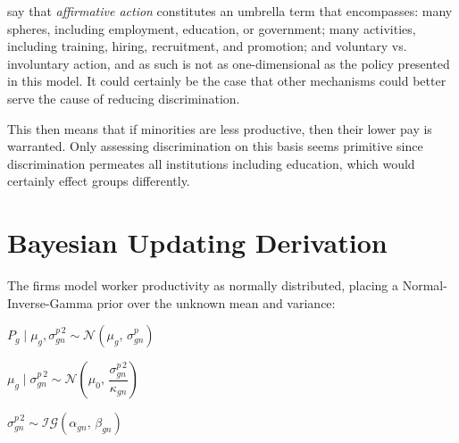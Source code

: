 \documentclass[]{article}
\begin{document}


\cite{HolzerNeumark1999} say that \textit{affirmative action} constitutes an umbrella term that encompasses: many spheres, including employment, education, or government; many activities, including training, hiring, recruitment, and promotion; and voluntary vs. involuntary action, and as such is not as one-dimensional as the policy presented in this model. It could certainly be the case that other mechanisms could better serve the cause of reducing discrimination.




This then means that if minorities are less productive, then their lower pay is warranted. Only assessing discrimination on this basis seems primitive since discrimination permeates all institutions including education, which would certainly effect groups differently.




\appendix
\section{Bayesian Updating Derivation}
\label{ap:derivation}

\noindent The firms model worker productivity as normally distributed, placing a 
Normal-Inverse-Gamma prior over the unknown mean and variance:

\begin{center}
	\vspace{0.2cm}
	$P_g \mid \mu_g, \sigma^{p\,2}_{gn} \sim \mathcal{N}\!\left(\mu_g,\, \sigma^p_{gn}\right)$
	\vspace{0.2cm}
	
	$\mu_g \mid \sigma^{p\,2}_{gn} \sim \mathcal{N}\!\left(\mu_0,\, \dfrac{\sigma^{p\,2}_{gn}}{\kappa_{gn}}\right)$
	\vspace{0.2cm}
	
	$\sigma^{p\,2}_{gn} \sim \mathcal{IG}\!\left(\alpha_{gn},\, \beta_{gn}\right)$
	\vspace{0.2cm}
\end{center}
\end{document}
